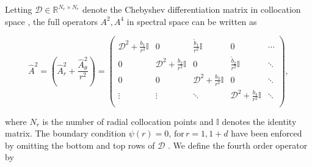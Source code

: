 \documentclass[a4paper]{article}
\begin{document}
\noindent Letting $\mathcal{D} \in \mathbb{R}^{N_r \times N_r}$ denote the Chebyshev differentiation matrix in collocation space \citep{trefethen2000spectral}, the full operators $A^2, A^4$ in spectral space can be written as

\begin{equation}
\hat{A}^2 = (\hat{A}^2_r + \frac{\hat{A}^2_{\theta}}{r^2}) = 
\begin{pmatrix}
\mathcal{D}^2 + \frac{b_1}{r^2} \mathbb{I} & 0 & \frac{\tilde{b}_1}{r^2} \mathbb{I} & 0 & \cdots \\
0 & \mathcal{D}^2 + \frac{b_2}{r^2} \mathbb{I} & 0 & \frac{\tilde{b}_2}{r^2} \mathbb{I} & \ddots \\
0 & 0 & \mathcal{D}^2 + \frac{b_3}{r^2} \mathbb{I} & 0 & \ddots \\
\vdots & \vdots & \ddots & \mathcal{D}^2 + \frac{b_4}{r^2} \mathbb{I} & \ddots \\
\end{pmatrix},
\label{eq:A2_Discrete_form}
\end{equation}

\noindent where $N_r$ is the number of radial collocation points and $\mathbb{I}$ denotes the identity matrix. The boundary condition $\psi(r) = 0, \, \text{for} \, r = 1,1+d$ have been enforced by omitting the bottom and top rows of $\mathcal{D}$ \citep{trefethen2000spectral}. We define the fourth order operator by
\end{document}
